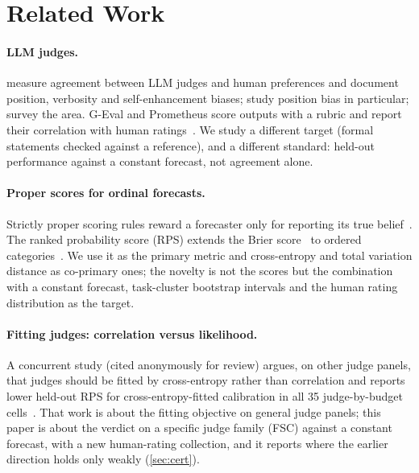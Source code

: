 \section{Related Work}
\label{sec:related}
\paragraph{LLM judges.}
\citet{zheng2023judging} measure agreement between LLM judges and human preferences and document position, verbosity and self-enhancement biases; \citet{wang2023fair} study position bias in particular; \citet{gu2024survey} survey the area.
G-Eval and Prometheus score outputs with a rubric and report their correlation with human ratings~\citep{liu2023geval,kim2024prometheus}.
We study a different target (formal statements checked against a reference), and a different standard: held-out performance against a constant forecast, not agreement alone.

\paragraph{Proper scores for ordinal forecasts.}
Strictly proper scoring rules reward a forecaster only for reporting its true belief~\citep{gneiting2007strictly,gneiting2014probabilistic}.
The ranked probability score (RPS) extends the Brier score~\citep{brier1950verification} to ordered categories~\citep{epstein1969scoring,murphy1971note}.
We use it as the primary metric and cross-entropy and total variation distance as co-primary ones; the novelty is not the scores but the combination with a constant forecast, task-cluster bootstrap intervals and the human rating distribution as the target.

\paragraph{Fitting judges: correlation versus likelihood.}
A concurrent study (cited anonymously for review) argues, on other judge panels, that judges should be fitted by cross-entropy rather than correlation and reports lower held-out RPS for cross-entropy-fitted calibration in all 35 judge-by-budget cells~\citep{anon2026corrce}.
That work is about the fitting objective on general judge panels; this paper is about the verdict on a specific judge family (FSC) against a constant forecast, with a new human-rating collection, and it reports where the earlier direction holds only weakly (\cref{sec:cert}).


